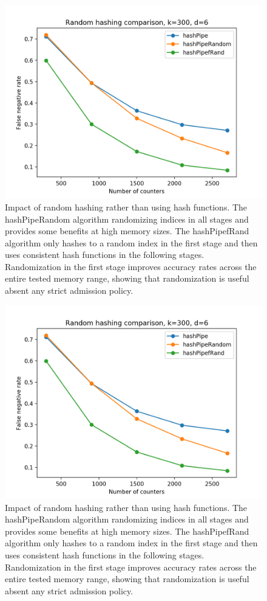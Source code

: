 \begin{figure}[t]
  \centering
    \includegraphics[scale=0.5]{interview}
     \caption{Impact of random hashing rather than using hash functions. The hashPipeRandom algorithm randomizing indices in all stages and provides some benefits at high memory sizes. The hashPipefRand algorithm only hashes to a random index in the first stage and then uses consistent hash functions in the following stages. Randomization in the first stage improves accuracy rates across the entire tested memory range, showing that randomization is useful absent any strict admission policy.}
\end{figure}

\begin{figure}[t]
  \centering
    \includegraphics[scale=0.5]{random}
     \caption{Impact of random hashing rather than using hash functions. The hashPipeRandom algorithm randomizing indices in all stages and provides some benefits at high memory sizes. The hashPipefRand algorithm only hashes to a random index in the first stage and then uses consistent hash functions in the following stages. Randomization in the first stage improves accuracy rates across the entire tested memory range, showing that randomization is useful absent any strict admission policy.}
     \label{fig:bp-image}
\end{figure}

